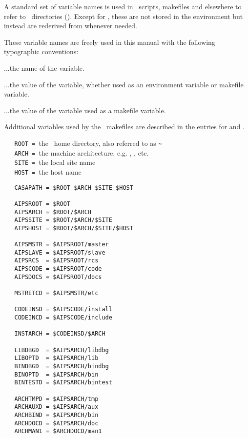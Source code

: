 A standard set of variable names is used in \casa\ scripts, makefiles and
elsewhere to refer to \casa\ directories ().  Except for
, these are not stored in the environment but instead are
rederived from  whenever needed.  

These variable names are freely used in this manual with the following
typographic conventions:

\begin{description}
   \item{}       ...the name of the variable.
   \item{}     ...the value of the  variable,
      whether used as an environment variable or makefile variable.
   \item{}   ...the value of the  variable
      used as a makefile variable.
\end{description}
 
Additional variables used by the \casa\ makefiles are described in the
entries for  and .
 
\noindent
\verb+   ROOT = +the \casa\ home directory, also referred to as
                 \verb+~+\\
\verb+   ARCH = +the machine architecture, e.g. , ,
                 etc.\\
\verb+   SITE = +the local site name\\
\verb+   HOST = +the host name
 
\begin{verbatim}
   CASAPATH = $ROOT $ARCH $SITE $HOST
 
   AIPSROOT = $ROOT
   AIPSARCH = $ROOT/$ARCH
   AIPSSITE = $ROOT/$ARCH/$SITE
   AIPSHOST = $ROOT/$ARCH/$SITE/$HOST
 
   AIPSMSTR = $AIPSROOT/master
   AIPSLAVE = $AIPSROOT/slave
   AIPSRCS  = $AIPSROOT/rcs
   AIPSCODE = $AIPSROOT/code
   AIPSDOCS = $AIPSROOT/docs
 
   MSTRETCD = $AIPSMSTR/etc
 
   CODEINSD = $AIPSCODE/install
   CODEINCD = $AIPSCODE/include

   INSTARCH = $CODEINSD/$ARCH
 
   LIBDBGD  = $AIPSARCH/libdbg
   LIBOPTD  = $AIPSARCH/lib
   BINDBGD  = $AIPSARCH/bindbg
   BINOPTD  = $AIPSARCH/bin
   BINTESTD = $AIPSARCH/bintest
 
   ARCHTMPD = $AIPSARCH/tmp
   ARCHAUXD = $AIPSARCH/aux
   ARCHBIND = $AIPSARCH/bin
   ARCHDOCD = $AIPSARCH/doc
   ARCHMAN1 = $ARCHDOCD/man1
\end{verbatim}

